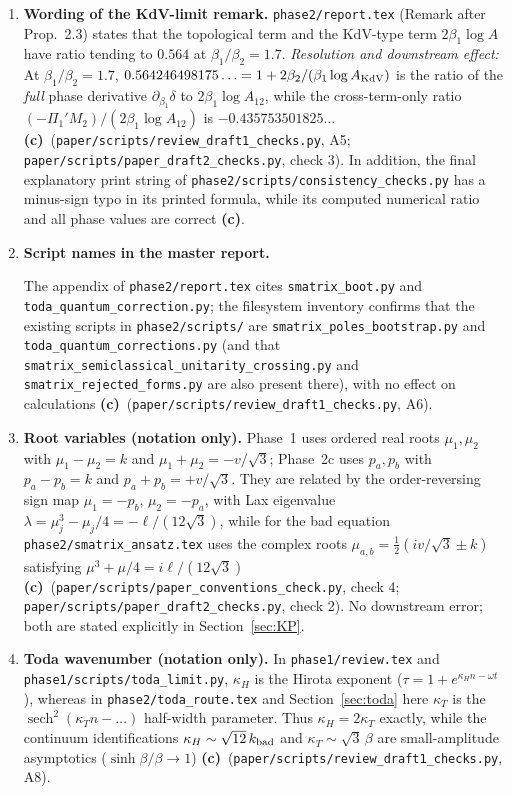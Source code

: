 \documentclass[11pt,a4paper]{article}
\newcommand{\lab}[1]{{\normalfont\sffamily\footnotesize\bfseries(#1)}}
\newcommand{\Lc}{\lab{c}}
\newcommand{\scr}[1]{\nolinkurl{#1}}
\newcommand{\sech}{\operatorname{sech}}
\theoremstyle{remark}
\begin{document}
\begin{enumerate}
\item \textbf{Wording of the KdV-limit remark.} \scr{phase2/report.tex} (Remark after Prop.~2.3) states that the topological term and the KdV-type term $2\beta_1\log A$ have ratio tending to $0.564$ at $\beta_1/\beta_2=1.7$. \emph{Resolution and downstream effect:} At $\beta_1/\beta_2=1.7$, $0.564246498175\ldots=1+2\beta_2/(\beta_1\log A_{\rm KdV})$ is the ratio of the \emph{full} phase derivative $\partial_{\beta_1}\delta$ to $2\beta_1\log A_{12}$, while the cross-term-only ratio $(-\Pi_1'M_2)/(2\beta_1\log A_{12})$ is $-0.435753501825\ldots$ \Lc\ (\scr{paper/scripts/review_draft1_checks.py}, A5; \scr{paper/scripts/paper_draft2_checks.py}, check 3). In addition, the final explanatory print string of \scr{phase2/scripts/consistency_checks.py} has a minus-sign typo in its printed formula, while its computed numerical ratio and all phase values are correct \Lc.
\item \textbf{Script names in the master report.} {\raggedright The appendix of \scr{phase2/report.tex} cites \scr{smatrix_boot.py} and \scr{toda_quantum_correction.py}; the filesystem inventory confirms that the existing scripts in \scr{phase2/scripts/} are \scr{smatrix_poles_bootstrap.py} and \scr{toda_quantum_corrections.py} (and that \scr{smatrix_semiclassical_unitarity_crossing.py} and \scr{smatrix_rejected_forms.py} are also present there), with no effect on calculations \Lc\ (\scr{paper/scripts/review_draft1_checks.py}, A6).\par}
\item \textbf{Root variables (notation only).} Phase~1 uses ordered real roots $\mu_1,\mu_2$ with $\mu_1-\mu_2=k$ and $\mu_1+\mu_2=-v/\sqrt3$; Phase~2c uses $p_a,p_b$ with $p_a-p_b=k$ and $p_a+p_b=+v/\sqrt3$. They are related by the order-reversing sign map $\mu_1=-p_b$, $\mu_2=-p_a$, with Lax eigenvalue $\lambda=\mu_j^3-\mu_j/4=-\ell/(12\sqrt3)$, while for the bad equation \scr{phase2/smatrix_ansatz.tex} uses the complex roots $\mu_{a,b}=\tfrac12(iv/\sqrt3\pm k)$ satisfying $\mu^3+\mu/4=i\ell/(12\sqrt3)$ \Lc\ (\scr{paper/scripts/paper_conventions_check.py}, check 4; \scr{paper/scripts/paper_draft2_checks.py}, check 2). No downstream error; both are stated explicitly in Section~\ref{sec:KP}.
\item \textbf{Toda wavenumber (notation only).} In \scr{phase1/review.tex} and \scr{phase1/scripts/toda_limit.py}, $\kappa_H$ is the Hirota exponent ($\tau=1+e^{\kappa_Hn-\omega t}$), whereas in \scr{phase2/toda_route.tex} and Section~\ref{sec:toda} here $\kappa_T$ is the $\sech^2(\kappa_Tn-\dots)$ half-width parameter. Thus $\kappa_H=2\kappa_T$ exactly, while the continuum identifications $\kappa_H\sim\sqrt{12}\,k_{\rm bad}$ and $\kappa_T\sim\sqrt3\,\beta$ are small-amplitude asymptotics ($\sinh\beta/\beta\to1$) \Lc\ (\scr{paper/scripts/review_draft1_checks.py}, A8).

\end{enumerate}
\end{document}
